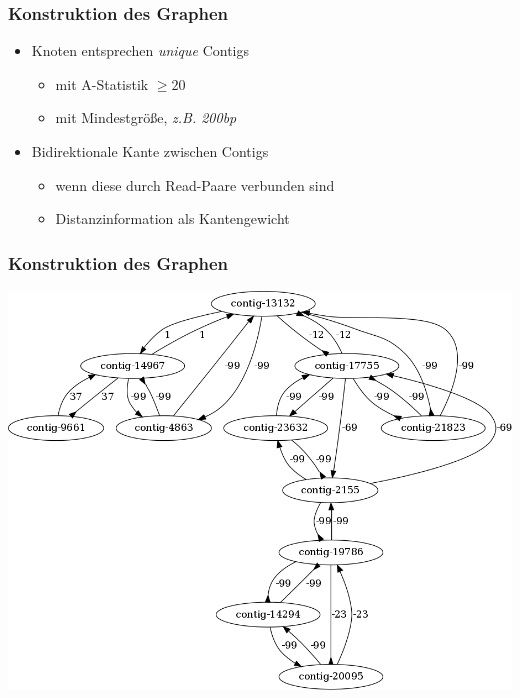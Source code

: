 \documentclass[xcolor=pst]{beamer}
\begin{document}
\begin{frame}
  \frametitle{Konstruktion des Graphen}
  \begin{itemize}
    \item Knoten entsprechen \textit{unique} Contigs
    \begin{itemize}
      \item mit A-Statistik $\geq 20$
      \item mit Mindestgröße, \textit{z.B. 200bp}
    \end{itemize}
    \item Bidirektionale Kante zwischen Contigs
    \begin{itemize}
      \item wenn diese durch Read-Paare verbunden sind
      \item Distanzinformation als Kantengewicht
    \end{itemize}
  \end{itemize}
\end{frame}

\begin{frame}
  \frametitle{Konstruktion des Graphen}
  \begin{center}
    \includegraphics[scale=0.25]{figures/s_cerevisiae_parsed_graph_example_small.png}
  \end{center}
\end{frame}
\end{document}
